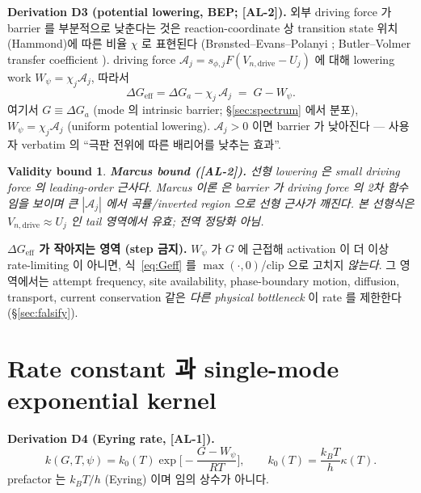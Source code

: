 \documentclass[11pt,a4paper]{article}
\newtheorem*{boundbox}{Validity bound}
\newcommand{\eff}{\mathrm{eff}}
\newcommand{\dimedrive}{\mathrm{drive}}
\newcommand{\AL}[1]{\textsf{[AL-#1]}}
\begin{document}
\textbf{Derivation D3 (potential lowering, BEP; \AL{2}).} 외부 driving force 가 barrier 를
부분적으로 낮춘다는 것은 reaction-coordinate 상 transition state 위치(Hammond)에 따른
비율 $\chi$ 로 표현된다 (Brønsted--Evans--Polanyi \cite{evanspolanyi1938}; Butler--Volmer
transfer coefficient \cite{bardfaulkner}). driving force $\mathcal A_j=s_{\phi,j}F(V_{n,\dimedrive}
-U_j)$ 에 대해 lowering work $W_\psi=\chi_j\mathcal A_j$, 따라서
\begin{equation}
\boxed{\;\Delta G_{\eff}=\Delta G_a-\chi_j\,\mathcal A_j\;=\;G-W_\psi.\;}
\label{eq:Geff}
\end{equation}
여기서 $G\equiv\Delta G_a$ (mode 의 intrinsic barrier; \S\ref{sec:spectrum} 에서 분포),
$W_\psi=\chi_j\mathcal A_j$ (uniform potential lowering). $\mathcal A_j>0$ 이면 barrier 가
낮아진다 — 사용자 verbatim 의 ``극판 전위에 따른 배리어를 낮추는 효과''.
\begin{boundbox}
\textbf{Marcus bound (\AL{2}).} 선형 lowering 은 small driving force 의 leading-order
근사다. Marcus 이론 \cite{marcus1956} 은 barrier 가 driving force 의 2차 함수임을 보이며
큰 $|\mathcal A_j|$ 에서 곡률/inverted region 으로 선형 근사가 깨진다. 본 선형식은
$V_{n,\dimedrive}\approx U_j$ 인 tail 영역에서 유효; 전역 정당화 아님.
\end{boundbox}
\textbf{$\Delta G_\eff$ 가 작아지는 영역 (step 금지).} $W_\psi$ 가 $G$ 에 근접해 activation
이 더 이상 rate-limiting 이 아니면, 식~\eqref{eq:Geff} 를 $\max(\cdot,0)$/clip 으로 고치지
\emph{않는다}. 그 영역에서는 attempt frequency, site availability, phase-boundary motion,
diffusion, transport, current conservation 같은 \emph{다른 physical bottleneck} 이 rate 를
제한한다 (\S\ref{sec:falsify}).

\section{Rate constant 과 single-mode exponential kernel}\label{sec:rate}
\textbf{Derivation D4 (Eyring rate, \AL{1}).}
\begin{equation}
k(G,T,\psi)=k_0(T)\exp\!\Big[-\frac{G-W_\psi}{RT}\Big],\qquad k_0(T)=\frac{k_BT}{h}\kappa(T).
\label{eq:rate}
\end{equation}
prefactor 는 $k_BT/h$ (Eyring) 이며 임의 상수가 아니다.
\end{document}
